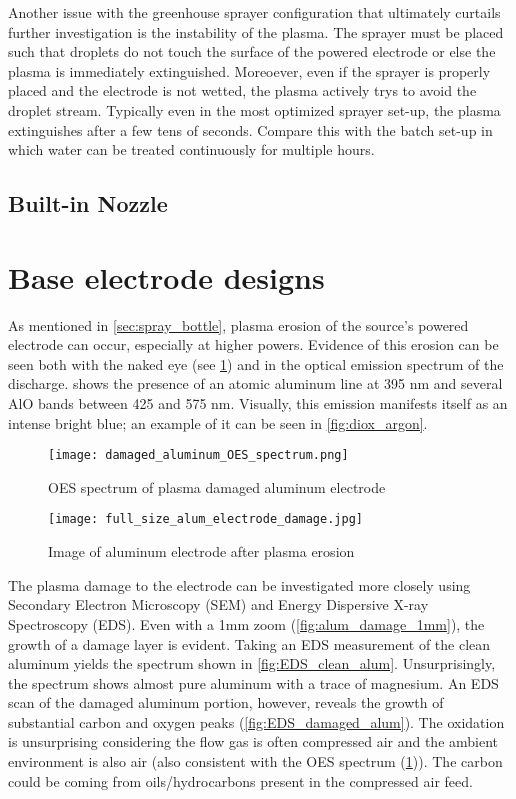 Another issue with the greenhouse sprayer configuration that ultimately curtails further investigation is the instability of the plasma. The sprayer must be placed such that droplets do not touch the surface of the powered electrode or else the plasma is immediately extinguished. Moreoever, even if the sprayer is properly placed and the electrode is not wetted, the plasma actively trys to avoid the droplet stream. Typically even in the most optimized sprayer set-up, the plasma extinguishes after a few tens of seconds. Compare this with the batch set-up in which water can be treated continuously for multiple hours.

\subsection{Built-in Nozzle}

\section{Base electrode designs}

As mentioned in \cref{sec:spray_bottle}, plasma erosion of the source's powered electrode can occur, especially at higher powers. Evidence of this erosion can be seen both with the naked eye (see \cref{fig:OES_alum_damage}) and in the optical emission spectrum of the discharge.  shows the presence of an atomic aluminum line at 395 nm and several AlO bands between 425 and 575 nm. Visually, this emission manifests itself as an intense bright blue; an example of it can be seen in \cref{fig:diox_argon}.

\begin{figure}[htbp]
  \centering
  \texttt{[image: damaged\_aluminum\_OES\_spectrum.png]}
  \caption{OES spectrum of plasma damaged aluminum electrode}
  \label{fig:OES_alum_damage}
\end{figure}

\begin{figure}[htbp]
  \centering
  \texttt{[image: full\_size\_alum\_electrode\_damage.jpg]}
  \caption{Image of aluminum electrode after plasma erosion}
  \label{fig:alum_damage_full}
\end{figure}

The plasma damage to the electrode can be investigated more closely using Secondary Electron Microscopy (SEM) and Energy Dispersive X-ray Spectroscopy (EDS). Even with a 1mm zoom (\cref{fig:alum_damage_1mm}), the growth of a damage layer is evident. Taking an EDS measurement of the clean aluminum yields the spectrum shown in \cref{fig:EDS_clean_alum}. Unsurprisingly, the spectrum shows almost pure aluminum with a trace of magnesium. An EDS scan of the damaged aluminum portion, however, reveals the growth of substantial carbon and oxygen peaks (\cref{fig:EDS_damaged_alum}). The oxidation is unsurprising considering the flow gas is often compressed air and the ambient environment is also air (also consistent with the OES spectrum (\cref{fig:OES_alum_damage})). The carbon could be coming from oils/hydrocarbons present in the compressed air feed.

